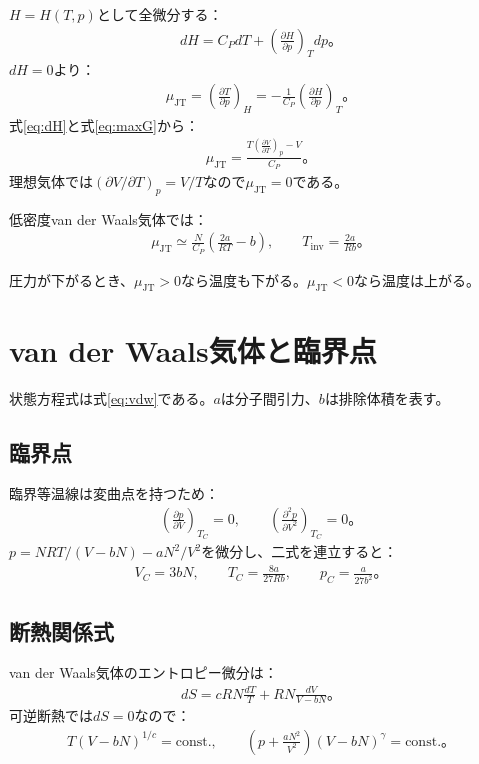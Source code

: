\documentclass[platex,dvipdfmx,a4paper,10pt]{jsarticle}
\newcommand{\key}[1]{\begin{framed}\noindent #1\end{framed}}
\begin{document}
$H=H(T,p)$として全微分する：
\begin{align*}
  dH=C_PdT+\left(\frac{\partial H}{\partial p}\right)_Tdp。
\end{align*}
$dH=0$より：
\begin{align*}
  \mu_{\mathrm{JT}}
  =\left(\frac{\partial T}{\partial p}\right)_H
  =-\frac{1}{C_P}\left(\frac{\partial H}{\partial p}\right)_T。
\end{align*}
式\eqref{eq:dH}と式\eqref{eq:maxG}から：
\begin{align}
  \mu_{\mathrm{JT}}
  =\frac{T\left(\frac{\partial V}{\partial T}\right)_p-V}{C_P}。\label{eq:JT}
\end{align}
理想気体では$(\partial V/\partial T)_p=V/T$なので$\mu_{\mathrm{JT}}=0$である。

低密度van der Waals気体では：
\begin{align}
  \mu_{\mathrm{JT}}\simeq\frac{N}{C_P}\left(\frac{2a}{RT}-b\right),\qquad
  T_{\mathrm{inv}}=\frac{2a}{Rb}。\label{eq:JTvdw}
\end{align}

\key{圧力が下がるとき、$\mu_{\mathrm{JT}}>0$なら温度も下がる。$\mu_{\mathrm{JT}}<0$なら温度は上がる。}

\newpage
\section{van der Waals気体と臨界点}\label{sec:vdw}
状態方程式は式\eqref{eq:vdw}である。$a$は分子間引力、$b$は排除体積を表す。

\subsection{臨界点}
臨界等温線は変曲点を持つため：
\begin{align}
  \left(\frac{\partial p}{\partial V}\right)_{T_C}=0,
  \qquad
  \left(\frac{\partial^2p}{\partial V^2}\right)_{T_C}=0。\label{eq:criticalconditions}
\end{align}
$p=NRT/(V-bN)-aN^2/V^2$を微分し、二式を連立すると：
\begin{align}
  V_C=3bN,\qquad
  T_C=\frac{8a}{27Rb},\qquad
  p_C=\frac{a}{27b^2}。\label{eq:criticalconstants}
\end{align}

\subsection{断熱関係式}
van der Waals気体のエントロピー微分は：
\begin{align*}
  dS=cRN\frac{dT}{T}+RN\frac{dV}{V-bN}。
\end{align*}
可逆断熱では$dS=0$なので：
\begin{align}
  T(V-bN)^{1/c}=\mathrm{const.},\qquad
  \left(p+\frac{aN^2}{V^2}\right)(V-bN)^\gamma=\mathrm{const.}。\label{eq:vdw-poisson}
\end{align}
\end{document}
